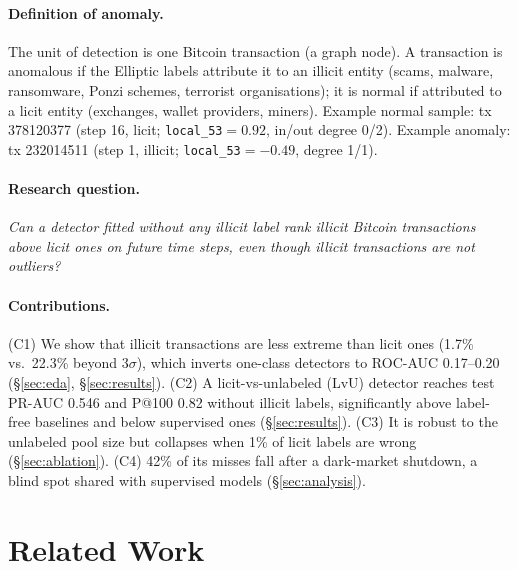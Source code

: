 \documentclass[11pt]{article}
\newcommand{\ours}{LvU}
\begin{document}
\paragraph{Definition of anomaly.}
The unit of detection is one Bitcoin transaction (a graph node).
A transaction is anomalous if the Elliptic labels attribute it to an illicit entity (scams, malware, ransomware, Ponzi schemes, terrorist organisations); it is normal if attributed to a licit entity (exchanges, wallet providers, miners).
Example normal sample: tx 378120377 (step 16, licit; \texttt{local\_53}$=0.92$, in/out degree 0/2).
Example anomaly: tx 232014511 (step 1, illicit; \texttt{local\_53}$=-0.49$, degree 1/1).

\paragraph{Research question.}
\emph{Can a detector fitted without any illicit label rank illicit Bitcoin transactions above licit ones on future time steps, even though illicit transactions are not outliers?}

\paragraph{Contributions.}
(C1) We show that illicit transactions are less extreme than licit ones (1.7\% vs.\ 22.3\% beyond 3$\sigma$), which inverts one-class detectors to ROC-AUC 0.17--0.20 (\S\ref{sec:eda}, \S\ref{sec:results}).
(C2) A licit-vs-unlabeled (\ours{}) detector reaches test PR-AUC 0.546 and P@100 0.82 without illicit labels, significantly above label-free baselines and below supervised ones (\S\ref{sec:results}).
(C3) It is robust to the unlabeled pool size but collapses when 1\% of licit labels are wrong (\S\ref{sec:ablation}).
(C4) 42\% of its misses fall after a dark-market shutdown, a blind spot shared with supervised models (\S\ref{sec:analysis}).

\section{Related Work}
\end{document}
